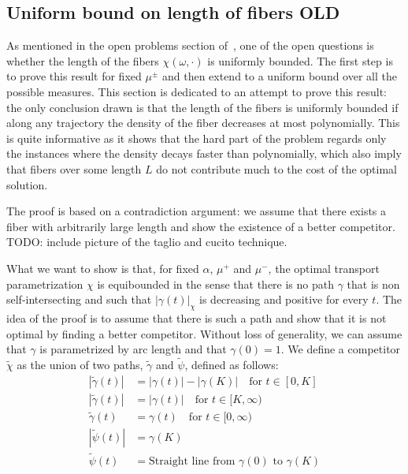 \documentclass[12pt,a4paper]{article}
\numberwithin{equation}{section}
\theoremstyle{mytheorem}
\theoremstyle{myremark}
\theoremstyle{myparagraph}
\begin{document}
    \subsection{Uniform bound on length of fibers OLD}

    As mentioned in the open problems section of~\cite[Chapter 15, question 13]{Bernot}, one of the open questions is whether the length of the fibers
    $\chi(\omega, \cdot)$ is uniformly bounded. The first step is to prove this result for fixed $\mu^\pm$ and then extend to a uniform bound over all the possible measures.
    This section is dedicated to an attempt to prove this result: the only conclusion drawn is that the length of the fibers is uniformly bounded if along any 
    trajectory the density of the fiber decreases at most polynomially. This is quite informative as it shows that the hard part of the problem regards only the instances
    where the density decays faster than polynomially, which also imply that fibers over some length $L$ do not contribute much to the cost of the optimal solution.

    The proof is based on a contradiction argument: we assume that there exists a fiber with arbitrarily large length and show the existence of a better competitor.
    TODO: include picture of the taglio and cucito technique.

    What we want to show is that, for fixed $\alpha$, $\mu^+$ and $\mu^-$, the optimal transport parametrization $\chi$
    is equibounded in the sense that there is no path $\gamma$ that is non self-intersecting and such that $|\gamma(t)|_\chi$ is decreasing and positive
    for every $t$.
    The idea of the proof is to assume that there is such a path and show that it is not optimal by finding a better competitor.
    Without loss of generality, we can assume that $\gamma$ is parametrized by arc length and that $\gamma(0) = 1$.
    We define a competitor $\tilde\chi$ as the union of two paths, $\tilde{\gamma}$ and $\tilde{\psi}$, defined as follows:
    \begin{align*}
        |\tilde{\gamma}(t)| &= |\gamma(t)| - |\gamma(K)| \quad \text{for } t \in [0, K] \\
        |\tilde{\gamma}(t)| &= |\gamma(t)| \quad \text{for } t \in [K, \infty) \\
        \tilde{\gamma}(t) &= \gamma(t) \quad \text{for } t \in [0, \infty) \\
        |\tilde{\psi}(t)| &= \gamma(K) \\
        \tilde{\psi}(t) &= \text{Straight line from } \gamma(0) \text{ to } \gamma(K)
    \end{align*}
\end{document}
